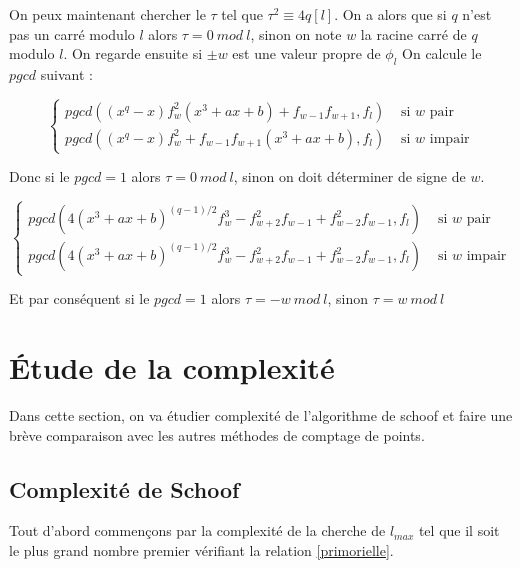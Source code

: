 \documentclass{article}%
\theoremstyle{plain}
\theoremstyle{definition}
\theoremstyle{plain}
\theoremstyle{plain}
\theoremstyle{remark}
\begin{document}
On peux maintenant chercher le $\tau$ tel que $\tau^{2}\equiv 4q [l]$.
On a alors que si $q$ n'est pas un carré modulo $l$ alors $\tau = 0\ mod\ l$, sinon on note $w$ la racine carré de $q$ modulo $l$. On regarde ensuite si $\pm w$ est une valeur propre de $\phi_{l}$
On calcule le $pgcd$ suivant : 

\begin{equation}
\begin{cases}pgcd((x^{q} - x)f_{w}^{2}(x^{3} + ax +b) + f_{w - 1}f_{w + 1},f_{l})&\text{ si }w\text{ pair}\\
pgcd((x^{q} - x)f_{w}^{2} + f_{w - 1}f_{w + 1}(x^{3} + ax +b),f_{l})&\text{ si }w\text{ impair}
\end{cases}
\end{equation}

Donc si le $pgcd = 1$ alors $\tau = 0\ mod\ l$, sinon on doit déterminer de signe de $w$. 

\begin{equation}
\begin{cases}pgcd(4(x^{3} + ax +  b)^{(q-1)/2}f_{w}^{3} - f_{w + 2}^{2}f_{w - 1} + f_{w - 2}^{2}f_{w - 1},f_{l})&\text{ si }w\text{ pair}\\
pgcd(4(x^{3} + ax +  b)^{(q-1)/2}f_{w}^{3} - f_{w + 2}^{2}f_{w - 1} + f_{w - 2}^{2}f_{w - 1},f_{l})&\text{ si }w\text{ impair}
\end{cases}
\end{equation}

Et par conséquent si le $pgcd = 1$ alors $\tau = -w\ mod\ l$, sinon $\tau = w\ mod\ l$


\section{Étude de la complexité}

Dans cette section, on va étudier complexité de l'algorithme de schoof et faire une brève comparaison avec les autres méthodes de comptage de points.

\subsection{Complexité de Schoof}

Tout d'abord commençons par la complexité de la cherche de $l_{max}$ tel que il soit le plus grand nombre premier vérifiant la relation \eqref{primorielle}.
\end{document}
